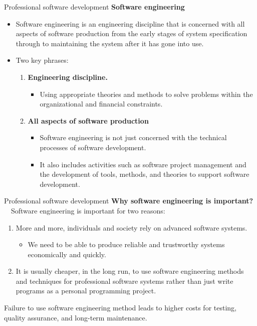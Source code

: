 \documentclass{beamer}
\begin{document}
\begin{frame}{Professional software development}
	\textbf{Software engineering}
	\begin{itemize}
		\item Software engineering is an engineering discipline that is concerned with all aspects of    software production from the early stages of system specification through to maintaining the system after it has gone into use.
		\item Two key phrases: 
		\begin{enumerate}
			\item \textbf{Engineering discipline.}
			\begin{itemize}
				\item Using appropriate theories and methods to solve problems within the 
				organizational and financial constraints.
			\end{itemize}
		\item \textbf{All aspects of software production} 
	
		\begin{itemize}
				\item Software engineering is not just concerned with the technical processes of software development. 
			\item It also includes activities such as software project management and the           development of tools, methods, and theories to support software development.
		\end{itemize}
		\end{enumerate}
	\end{itemize}
\end{frame}
\begin{frame}{Professional software development}
	\textbf{Why software engineering is important? }\\
\ \ 	Software engineering is important for two reasons:
\begin{enumerate}
	\item More and more, individuals and society rely on advanced software systems.
	\begin{itemize}
		\item We need to be able to produce reliable and trustworthy systems economically and quickly.
	\end{itemize} 
	\item It is usually cheaper, in the long run, to use software engineering methods and 
	techniques for professional software systems rather than just write programs as a       
	personal programming project. 
	
\end{enumerate}
Failure to use software engineering method leads to higher costs for testing, quality assurance, and long-term maintenance.	
\end{frame}
\end{document}
